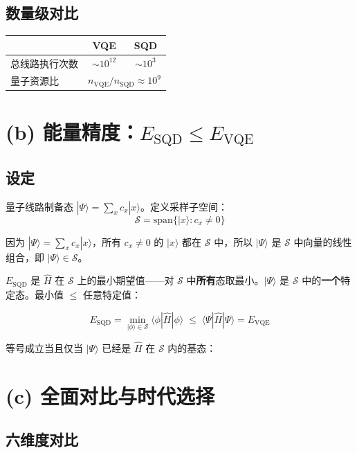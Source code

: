 \documentclass[11pt,a4paper]{article}
\begin{document}
\subsection{数量级对比}

\begin{center}
\begin{tabular}{lcc}
  \toprule
  & VQE & SQD \\
  \midrule
  总线路执行次数 & $\sim 10^{12}$ & $\sim 10^3$ \\
  量子资源比 & \multicolumn{2}{c}{$n_{\text{VQE}} / n_{\text{SQD}} \approx 10^9$} \\
  \bottomrule
\end{tabular}
\end{center}

\section{(b) 能量精度：$E_{\text{SQD}} \leq E_{\text{VQE}}$}

\subsection{设定}

量子线路制备态 $|\Psi\rangle = \sum_x c_x |x\rangle$。定义采样子空间：
$$\mathcal{S} = \text{span}\{|x\rangle : c_x \neq 0\}$$

因为 $|\Psi\rangle = \sum_x c_x |x\rangle$，所有 $c_x \neq 0$ 的 $|x\rangle$ 都在 $\mathcal{S}$ 中，所以 $|\Psi\rangle$ 是 $\mathcal{S}$ 中向量的线性组合，即 $|\Psi\rangle \in \mathcal{S}$。

$E_{\text{SQD}}$ 是 $\hat{H}$ 在 $\mathcal{S}$ 上的最小期望值——对 $\mathcal{S}$ 中\textbf{所有}态取最小。$|\Psi\rangle$ 是 $\mathcal{S}$ 中的\textbf{一个}特定态。最小值 $\leq$ 任意特定值：

$$\boxed{E_{\text{SQD}} = \min_{|\phi\rangle \in \mathcal{S}} \langle\phi|\hat{H}|\phi\rangle \;\leq\; \langle\Psi|\hat{H}|\Psi\rangle = E_{\text{VQE}}}$$

等号成立当且仅当 $|\Psi\rangle$ 已经是 $\hat{H}$ 在 $\mathcal{S}$ 内的基态：

\section{(c) 全面对比与时代选择}

\subsection{六维度对比}
\end{document}
